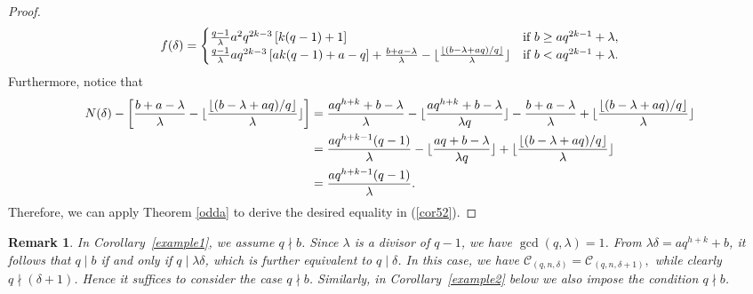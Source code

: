 \documentclass[journal,onecolumn]{IEEEtran}
\newtheorem{Remark}{Remark}
\begin{document}
\begin{proof}
\begin{equation}
     f(\delta)=
     \begin{cases}        
  \frac{q-1}{\lambda}a^2q^{2k-3}\left[k(q-1)+1\right]& \hbox{if }b\geq  a q^{2k-1}+\lambda,\\
\frac{q-1}{\lambda}  a  q^{2k-3}\left[ ak(q-1)+a-q 
 \right]+\frac{b+a-\lambda}{\lambda} - \lfloor\frac{\lfloor (b-\lambda+aq)/q\rfloor}{\lambda} \rfloor  &\hbox{if } b< a q^{2k-1}+\lambda.
     \end{cases}
 \end{equation}
 Furthermore, notice that \begin{equation}\notag\begin{split}   
     N(\delta)- \left[\frac{b+a-\lambda}{\lambda} - \lfloor\frac{\lfloor (b-\lambda+aq)/q\rfloor}{\lambda} \rfloor\right]& = \frac{aq^{h+k}+b-\lambda}{\lambda} -\lfloor \frac{aq^{h+k}+b-\lambda}{\lambda q}\rfloor -\frac{b+a-\lambda}{\lambda}+\lfloor\frac{\lfloor (b-\lambda+aq)/q\rfloor}{\lambda} \rfloor\\
     &= \frac{aq^{h+k-1}(q-1)}{\lambda} -\lfloor \frac{aq+b-\lambda}{\lambda q}\rfloor + \lfloor\frac{\lfloor (b-\lambda+aq)/q\rfloor}{\lambda} \rfloor\\
     &= \frac{aq^{h+k-1}(q-1)}{\lambda}. 
     \end{split}
 \end{equation}
 Therefore,  we can apply Theorem  \ref{odda} to derive the desired equality in (\ref{cor52}).   
\end{proof}



\begin{Remark}
In Corollary~\ref{example1}, we assume $q\nmid b$. Since $\lambda$ is a divisor of $q-1$, we have $\gcd(q,\lambda)=1$. From $\lambda \delta = a q^{h+k} + b$, it follows that $q\mid b$ if and only if $q\mid \lambda\delta$, which is further equivalent to $q\mid \delta$. In this case,
we have $
\mathcal{C}_{(q,n,\delta)} = \mathcal{C}_{(q,n,\delta+1)},
$
while clearly $q\nmid (\delta+1)$. Hence it suffices to consider the case $q\nmid b$. Similarly, in Corollary~\ref{example2} below we also impose the condition $q\nmid b$.
\end{Remark}
\end{document}
